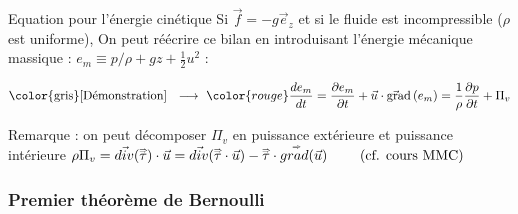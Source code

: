 \begin{frame}{Equation pour l'énergie cinétique}
Si $\vec f = -g \vec{e}_z$ et si le fluide est incompressible ($\rho$ est uniforme),
On peut réécrire ce bilan en introduisant l'énergie mécanique massique : 
$e_m \equiv p/\rho  + g z + \frac{1}{2} u^2 $ :


\begin{equation}
  \mbox{\color{gris} [Démonstration] \; $\longrightarrow$ \;}
	\color{rouge}
  \ddt{e_m} = \dpdt{e_m} + \myvec{u}\cdot \gradient \left (e_m\right)
  = 
\frac{1}{\rho} \frac{\partial p}{\partial t} + \Pi_v 
\end{equation}

\pause
\medskip
\small

Remarque : on peut décomposer $\Pi_v$ en puissance extérieure et puissance intérieure 
 $\rho \Pi_v = \vec{div}({\accentset{\Rightarrow}{\tau}}) \cdot \vec{u} 
=  \vec{div}({\accentset{\Rightarrow}{\tau}} \cdot \vec{u} )
- \accentset{\Rightarrow}{\tau} \cdot  \accentset{\Rightarrow}{grad} (\vec{u}) 
\qquad \mbox{ (cf. cours MMC) }
$ 


\vspace{0mm}

\end{frame}



\subsubsection{Premier théorème de Bernoulli}


